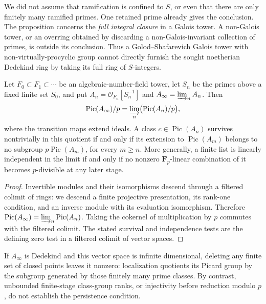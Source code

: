 \begin{remark}
We did not assume that ramification is confined to $S$, or even
that there are only finitely many ramified primes.  One retained
prime already gives the conclusion.  The proposition concerns the
\emph{full integral closure} in a Galois tower.  A non-Galois
tower, or an overring obtained by discarding a non-Galois-invariant
collection of primes, is outside its conclusion.  Thus a
Golod--Shafarevich Galois tower with non-virtually-procyclic group
cannot directly furnish the sought noetherian Dedekind ring by
taking its full ring of $S$-integers.
\end{remark}

\begin{lemma}
\label{C:A2-class-persistence}
Let $F_0\subset F_1\subset\cdots$ be an algebraic-number-field
tower, let $S_n$ be the primes above a fixed finite set $S_0$,
and put $A_n=\mathcal O_{F_n}[S_n^{-1}]$ and
$A_\infty=\varinjlim_n A_n$.  Then
\[
 \operatorname{Pic}(A_\infty)/p
   =\varinjlim_n\bigl(\operatorname{Pic}(A_n)/p\bigr),
\]
where the transition maps extend ideals.  A class
$c\in\operatorname{Pic}(A_n)$ survives nontrivially in this
quotient if and only if its extension to
$\operatorname{Pic}(A_m)$ belongs to no subgroup
$p\operatorname{Pic}(A_m)$, for every $m\ge n$.
More generally, a finite list is linearly independent in the
limit if and only if no nonzero $\mathbf F_p$-linear combination
of it becomes $p$-divisible at any later stage.
\end{lemma}

\begin{proof}
Invertible modules and their isomorphisms descend through a
filtered colimit of rings: we descend a finite projective
presentation, its rank-one condition, and an inverse module with
its evaluation isomorphism.  Therefore
$\operatorname{Pic}(A_\infty)=\varinjlim_n\operatorname{Pic}(A_n)$.
Taking the cokernel of multiplication by $p$ commutes with the
filtered colimit.  The stated survival and independence tests
are the defining zero test in a filtered colimit of vector spaces.
\end{proof}

If $A_\infty$ is Dedekind and this vector space is infinite
dimensional, deleting any finite set of closed points leaves it
nonzero: localization quotients its Picard group by the subgroup
generated by those finitely many prime classes.  By contrast,
unbounded finite-stage class-group ranks, or injectivity before
reduction modulo $p$, do not establish the persistence condition.

